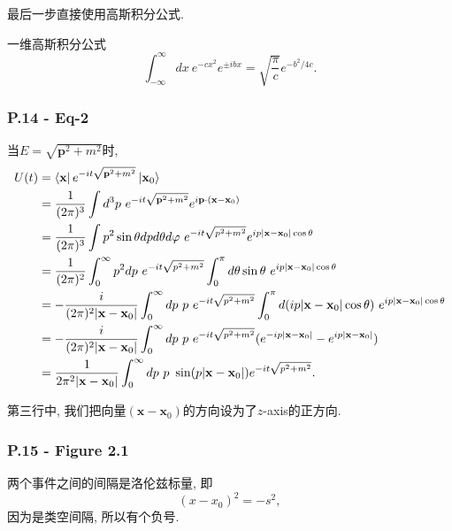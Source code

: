 \documentclass[cn,hazy,blue,11pt,device=normal,chinesefont=founder]{elegantnote}
\begin{document}
最后一步直接使用高斯积分公式. 

\begin{note}
一维高斯积分公式
\begin{equation}
\int_{-\infty}^{\infty}dx\ e^{-cx^2}e^{\pm ibx} = \sqrt{\frac{\pi}{c}}e^{-b^2/4c}. 
\end{equation}
\end{note}

\subsubsection{P.14​ - Eq-2}

当$E = \sqrt{\mathbf{p}^2+m^2}$时, 
\begin{equation}
  \begin{aligned}
  U(t) &= \mathinner{\langle \mathbf{x}|}e^{-it\sqrt{\mathbf{p}^2+m^2}}\mathinner{|\mathbf{x}_0\rangle} \\
       &= \frac{1}{(2\pi)^3} \int d^3p \ e^{-it\sqrt{\mathbf{p}^2+m^2}} e^{i\mathbf{p}\cdot(\mathbf{x}-\mathbf{x}_0)} \\ 
       &= \frac{1}{(2\pi)^3} \int p^2\sin\theta dp d\theta d\varphi \ e^{-it\sqrt{p^2+m^2}} e^{ip|\mathbf{x}-\mathbf{x}_0|\cos\theta} \\ 
       &= \frac{1}{(2\pi)^2} \int_0^\infty p^2 dp \ e^{-it\sqrt{p^2+m^2}} \int_0^\pi d\theta \sin\theta \ e^{ip|\mathbf{x}-\mathbf{x}_0|\cos\theta} \\
       &= -\frac{i}{(2\pi)^2|\mathbf{x}-\mathbf{x}_0|} \int_0^\infty dp \ p\ e^{-it\sqrt{p^2+m^2}} \int_0^\pi d(ip|\mathbf{x}-\mathbf{x}_0|\cos\theta) \ e^{ip|\mathbf{x}-\mathbf{x}_0|\cos\theta} \\
       &= -\frac{i}{(2\pi)^2|\mathbf{x}-\mathbf{x}_0|} \int_0^\infty dp \ p\ e^{-it\sqrt{p^2+m^2}} (e^{-ip|\mathbf{x}-\mathbf{x}_0|}-e^{ip|\mathbf{x}-\mathbf{x}_0|}) \\
       &= \frac{1}{2\pi^2|\mathbf{x}-\mathbf{x}_0|} \int_0^\infty dp \ p\ \sin(p|\mathbf{x}-\mathbf{x}_0|) e^{-it\sqrt{p^2+m^2}}. 
  \end{aligned}
\end{equation}

第三行中, 我们把向量$(\mathbf{x}-\mathbf{x}_0)$的方向设为了$z$-axis的正方向. 

\subsubsection{P.15 - Figure 2.1}

两个事件之间的间隔是洛伦兹标量, 即
\begin{equation}
  (x-x_0)^2 = -s^2,
\end{equation}
因为是类空间隔, 所以有个负号. 
\end{document}
